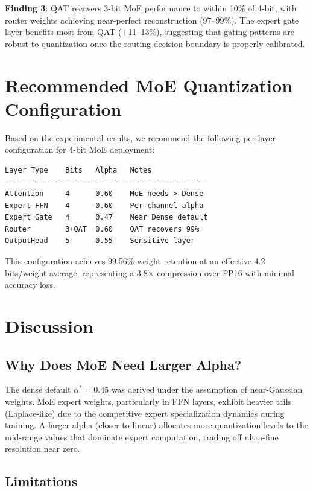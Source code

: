 \textbf{Finding 3}: QAT recovers 3-bit MoE performance to within 10\% of 4-bit, with
router weights achieving near-perfect reconstruction (97--99\%). The expert gate
layer benefits most from QAT (+11--13\%), suggesting that gating patterns are
robust to quantization once the routing decision boundary is properly calibrated.

\section{Recommended MoE Quantization Configuration}

Based on the experimental results, we recommend the following per-layer
configuration for 4-bit MoE deployment:

\begin{verbatim}
Layer Type    Bits   Alpha   Notes
-----------------------------------------------
Attention     4      0.60    MoE needs > Dense
Expert FFN    4      0.60    Per-channel alpha
Expert Gate   4      0.47    Near Dense default
Router        3+QAT  0.60    QAT recovers 99%
OutputHead    5      0.55    Sensitive layer
\end{verbatim}

This configuration achieves 99.56\% weight retention at an effective 4.2 bits/weight
average, representing a 3.8$\times$ compression over FP16 with minimal accuracy loss.

\section{Discussion}

\subsection{Why Does MoE Need Larger Alpha?}

The dense default $\alpha^* = 0.45$ was derived under the assumption of
near-Gaussian weights. MoE expert weights, particularly in FFN layers, exhibit
heavier tails (Laplace-like) due to the competitive expert specialization
dynamics during training. A larger alpha (closer to linear) allocates more
quantization levels to the mid-range values that dominate expert computation,
trading off ultra-fine resolution near zero.

\subsection{Limitations}

